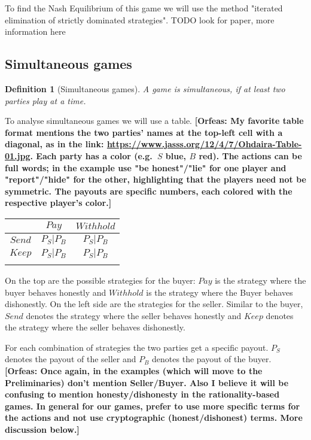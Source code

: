 \documentclass{cacthesis}
\newcommand{\authnote}[3]{{ \footnotesize \textbf{#1[#2: #3]~}}}
\newcommand{\orfnote}[1]{\authnote{\color{blue}}{Orfeas}{#1}}
\newtheorem{definition}{Definition}
\begin{document}
To find the Nash Equilibrium of this game we will use the method "iterated elimination of strictly dominated strategies".
TODO look for paper,  more information here

\subsection{Simultaneous games}
\begin{definition}[Simultaneous games]
\label{def:simultaneous-game}
A game is simultaneous, if at least two parties play at a time. 
\end{definition}

To analyse simultaneous games we will use a table.
\orfnote{My favorite table format mentions the two parties' names at the
top-left cell with a diagonal, as in the link:
\url{https://www.jasss.org/12/4/7/Ohdaira-Table-01.jpg}. Each party has a color
(e.g.\ $S$ blue, $B$ red). The actions can be full words; in the example use "be
honest"/"lie" for one player and "report"/"hide" for the other, highlighting
that the players need not be symmetric. The payouts are specific numbers,
each colored with the respective player's color.}
\begin{center}
\begin{tabular}{ c||c|c| }
& $Pay$ & $Withhold$  \\
\hline
\hline
$Send$ & $P_S | P_B$ & $P_S | P_B$ \\
\hline
$Keep$ & $P_S | P_B$ & $P_S | P_B$ \\ 
\hline
\label{tab:example-table}
\end{tabular}
\end{center}

 On the top are the possible strategies for the buyer: $Pay$ is the strategy where the buyer behaves honestly and $Withhold$ is the strategy where the Buyer behaves dishonestly.\newline
On the left side are the strategies for the seller. Similar to the buyer, $Send$ denotes the strategy where the seller behaves honestly and $Keep$ denotes the strategy where the seller behaves dishonestly.\newline

For each combination of strategies the two parties get a specific payout. $P_S$ denotes the payout of the seller and $P_B$ denotes the payout of the buyer.
\orfnote{Once again, in the examples (which will move to the Preliminaries)
don't mention Seller/Buyer. Also I believe it will be confusing to mention
honesty/dishonesty in the rationality-based games. In general for our games,
prefer to use more specific terms for the actions and not use cryptographic
(honest/dishonest) terms. More discussion below.}
\end{document}

